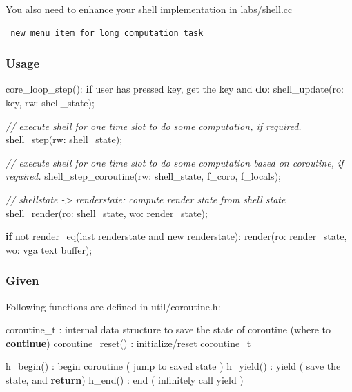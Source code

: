 \documentclass[]{book}
\newenvironment{Shaded}{}{}
\newcommand{\KeywordTok}[1]{\textbf{{#1}}}
\newcommand{\CommentTok}[1]{\textcolor[rgb]{0.50,0.50,0.50}{\textit{{#1}}}}
\newcommand{\NormalTok}[1]{{#1}}
\begin{document}
You also need to enhance your shell implementation in labs/shell.cc

\begin{verbatim}
 new menu item for long computation task
\end{verbatim}

\subsubsection*{Usage}\label{usage-4}

\begin{Shaded}
\begin{Highlighting}[]
   \NormalTok{core_loop_step():}
       \KeywordTok{if} \NormalTok{user has pressed key, get the key and }\KeywordTok{do}\NormalTok{:}
           \NormalTok{shell_update(ro: key, rw: shell_state);}

       \CommentTok{// execute shell for one time slot to do some computation, if required.}
       \NormalTok{shell_step(rw: shell_state);}

       \CommentTok{// execute shell for one time slot to do some computation based on coroutine, if required.}
       \NormalTok{shell_step_coroutine(rw: shell_state, f_coro, f_locals);}

       \CommentTok{// shellstate -> renderstate: compute render state from shell state}
       \NormalTok{shell_render(ro: shell_state, wo: render_state);}

       \KeywordTok{if} \NormalTok{not render_eq(last renderstate and new renderstate):}
           \NormalTok{render(ro: render_state, wo: vga text buffer);}
\end{Highlighting}
\end{Shaded}

\subsubsection*{Given}\label{given-4}

Following functions are defined in util/coroutine.h:

\begin{Shaded}
\begin{Highlighting}[]
    \NormalTok{coroutine_t        : internal data structure to save the state of coroutine (where to }\KeywordTok{continue}\NormalTok{)}
    \NormalTok{coroutine_reset()  : initialize/reset coroutine_t}

    \NormalTok{h_begin()          : begin coroutine ( jump to saved state )}
    \NormalTok{h_yield()          : yield           ( save the state, and }\KeywordTok{return}\NormalTok{)}
    \NormalTok{h_end()            : end             ( infinitely call yield )}
\end{Highlighting}
\end{Shaded}
\end{document}
